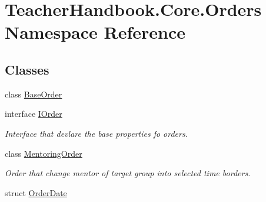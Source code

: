 \hypertarget{namespace_teacher_handbook_1_1_core_1_1_orders}{}\section{Teacher\+Handbook.\+Core.\+Orders Namespace Reference}
\label{namespace_teacher_handbook_1_1_core_1_1_orders}
\subsection*{Classes}
\begin{DoxyCompactItemize}
\item 
class \mbox{\hyperlink{class_teacher_handbook_1_1_core_1_1_orders_1_1_base_order}{Base\+Order}}
\item 
interface \mbox{\hyperlink{interface_teacher_handbook_1_1_core_1_1_orders_1_1_i_order}{I\+Order}}
\begin{DoxyCompactList}\small\item\em Interface that devlare the base properties fo orders. \end{DoxyCompactList}\item 
class \mbox{\hyperlink{class_teacher_handbook_1_1_core_1_1_orders_1_1_mentoring_order}{Mentoring\+Order}}
\begin{DoxyCompactList}\small\item\em Order that change mentor of target group into selected time borders. \end{DoxyCompactList}\item 
struct \mbox{\hyperlink{struct_teacher_handbook_1_1_core_1_1_orders_1_1_order_date}{Order\+Date}}
\end{DoxyCompactItemize}
